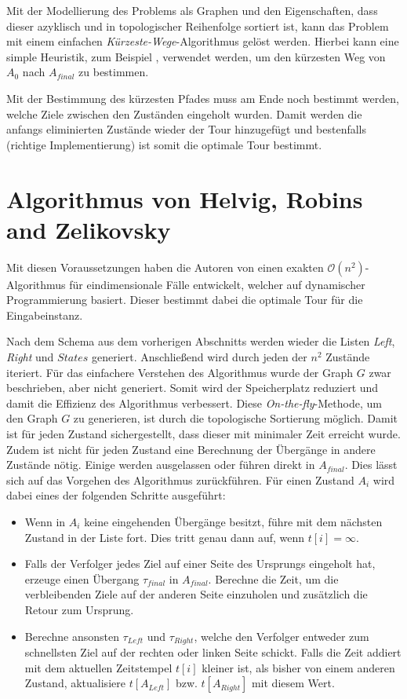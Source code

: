 \documentclass[german,version-2019-11]{uzl-thesis}
\begin{document}
Mit der Modellierung des Problems als Graphen und den Eigenschaften, dass dieser azyklisch und in topologischer Reihenfolge sortiert ist, kann das Problem mit einem einfachen \emph{Kürzeste-Wege}-Algorithmus gelöst werden. Hierbei kann eine simple Heuristik, zum Beispiel \cite{brandstadt1994kurzeste}, verwendet werden, um den kürzesten Weg von $A_0$ nach $A_{final}$ zu bestimmen.

Mit der Bestimmung des kürzesten Pfades muss am Ende noch bestimmt werden, welche Ziele zwischen den Zuständen eingeholt wurden. Damit werden die anfangs eliminierten Zustände wieder der Tour hinzugefügt und bestenfalls (richtige Implementierung) ist somit die optimale Tour bestimmt.

\section{Algorithmus von Helvig, Robins and Zelikovsky}

Mit diesen Voraussetzungen haben die Autoren von \cite{helvig} einen exakten $\mathcal{O}(n^2)$-Algorithmus für eindimensionale Fälle entwickelt, welcher auf dynamischer Programmierung basiert. Dieser bestimmt dabei die optimale Tour für die Eingabeinstanz. 

Nach dem Schema aus dem vorherigen Abschnitts werden wieder die Listen \emph{Left}, \emph{Right} und $States$ generiert. Anschließend wird durch jeden der $n^2$ Zustände iteriert. Für das einfachere Verstehen des Algorithmus wurde der Graph $G$ zwar beschrieben, aber nicht generiert. Somit wird der Speicherplatz reduziert und damit die Effizienz des Algorithmus verbessert. Diese \emph{On-the-fly}-Methode, um den Graph $G$ zu generieren, ist durch die topologische Sortierung möglich. Damit ist für jeden Zustand sichergestellt, dass dieser mit minimaler Zeit erreicht wurde. Zudem ist nicht für jeden Zustand eine Berechnung der Übergänge in andere Zustände nötig. Einige werden ausgelassen oder führen direkt in $A_{final}$. Dies lässt sich auf das Vorgehen des Algorithmus zurückführen. Für einen Zustand $A_i$ wird dabei eines der folgenden Schritte ausgeführt:
\begin{itemize}
\item Wenn in $A_i$ keine eingehenden Übergänge besitzt, führe mit dem nächsten Zustand in der Liste fort. Dies tritt genau dann auf, wenn $t[i] = \infty$.
\item Falls der Verfolger jedes Ziel auf einer Seite des Ursprungs eingeholt hat, erzeuge einen Übergang $\tau_{final}$ in $A_{final}$. Berechne die Zeit, um die verbleibenden Ziele auf der anderen Seite einzuholen und zusätzlich die Retour zum Ursprung. 
\item Berechne ansonsten $\tau_{Left}$ und $\tau_{Right}$, welche den Verfolger entweder zum schnellsten Ziel auf der rechten oder linken Seite schickt. Falls die Zeit addiert mit dem aktuellen Zeitstempel $t[i]$ kleiner ist, als bisher von einem anderen Zustand, aktualisiere $t[A_{Left}]$ bzw. $t[A_{Right}]$ mit diesem Wert.
\end{itemize}
\end{document}
